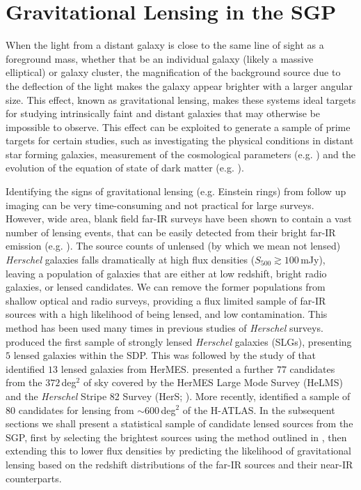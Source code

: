 \section{Gravitational Lensing in the SGP}

When the light from a distant galaxy is close to the same line of sight as a foreground mass, whether that be an individual galaxy (likely a massive elliptical) or galaxy cluster, the magnification of the background source due to the deflection of the light makes the galaxy appear brighter with a larger angular size. This effect, known as gravitational lensing, makes these systems ideal targets for studying intrinsically faint and distant galaxies that may otherwise be impossible to observe. This effect can be exploited to generate a sample of prime targets for certain studies, such as investigating the physical conditions in distant star forming galaxies, measurement of the cosmological parameters (e.g. \citealt{Kochanek_1992, Kochanek_1996, Grillo_2008, Oguri_2012, Eales_2015}) and the evolution of the equation of state of dark matter (e.g. \citealt{Zhang_2009}). 

Identifying the signs of gravitational lensing (e.g. Einstein rings) from follow up imaging can be very time-consuming and not practical for large surveys. However, wide area, blank field far-IR surveys have been shown to contain a vast number of lensing events, that can be easily detected from their bright far-IR emission (e.g. \citealt{Blain_1996, Perrotta_2002, Negrello_2007, Paciga_2009, Bakx_2020}). The source counts of unlensed (by which we mean not lensed) \textit{Herschel} galaxies falls dramatically at high flux densities ($S_{500} \gtrsim 100\,$mJy), leaving a population of galaxies that are either at low redshift, bright radio galaxies, or lensed candidates. We can remove the former populations from shallow optical and radio surveys, providing a flux limited sample of far-IR sources with a high likelihood of being lensed, and low contamination. This method has been used many times in previous studies of \textit{Herschel} surveys. \citealt{Negrello_2010} produced the first sample of strongly lensed \textit{Herschel} galaxies (SLGs), presenting $5$ lensed galaxies within the SDP. This was followed by the study of \citealt{Wardlow_2013} that identified $13$ lensed galaxies from HerMES. \citealt{Nayyeri_2016} presented a further $77$ candidates from the $372\,$deg$^2$ of sky covered by the HerMES Large Mode Survey (HeLMS) and the \textit{Herschel} Stripe 82 Survey (HerS; \citealt{Viero_2014}). More recently, \citealt{Negrello_2017} identified a sample of $80$ candidates for lensing from $\sim 600\,$deg$^2$ of the H-ATLAS. In the subsequent sections we shall present a statistical sample of candidate lensed sources from the SGP, first by selecting the brightest sources using the method outlined in \citealt{Negrello_2017}, then extending this to lower flux densities by predicting the likelihood of gravitational lensing based on the redshift distributions of the far-IR sources and their near-IR counterparts. 

